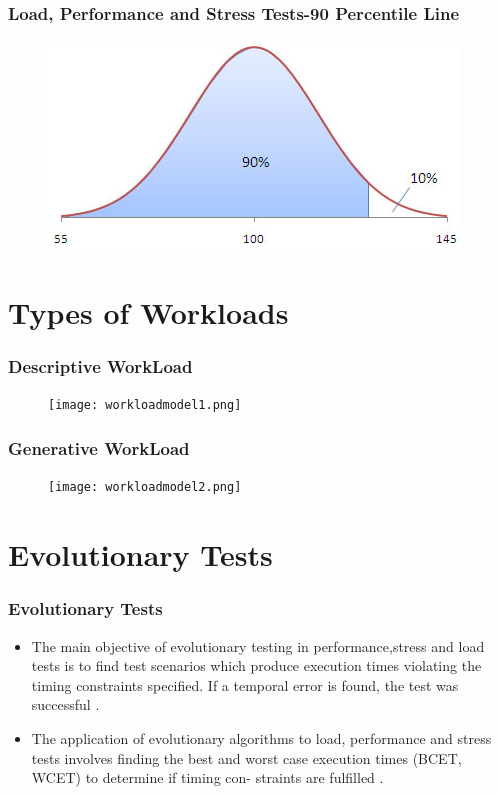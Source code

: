 \documentclass{beamer}
\begin{document}
\begin{frame}
\frametitle{Load, Performance and Stress Tests-90 Percentile Line}
\begin{figure}[H]
\centering
\includegraphics[width=1\linewidth]{90percentile.png}
\end{figure}
\end{frame}

\section{Types of Workloads}

\begin{frame}
\frametitle{Descriptive WorkLoad}
\begin{figure}[H]
\centering
\texttt{[image: workloadmodel1.png]}
\end{figure}
\end{frame}


\begin{frame}
\frametitle{Generative WorkLoad}
\begin{figure}[H]
\centering
\texttt{[image: workloadmodel2.png]}
\end{figure}
\end{frame}


\section{Evolutionary Tests}

\begin{frame}
\frametitle{Evolutionary Tests}

\begin{itemize}
\item The main objective of evolutionary testing in performance,stress and load tests is to find test scenarios which produce execution times violating the timing constraints specified. If a temporal error is found, the test was successful \cite{Sullivan}. 

\item The application of evolutionary algorithms to load, performance and stress tests involves finding the best and worst case execution times (BCET, WCET) to determine if timing con- straints are fulfilled \cite{Afzal2009}.
\end{itemize}

\end{frame}
\end{document}
